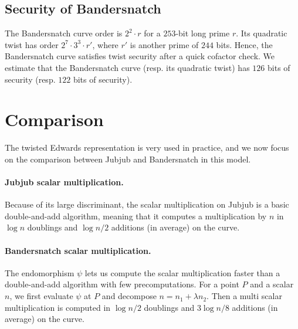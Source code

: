 \documentclass{article}
\newcommand{\SM}[1]{\color{blue}#1\color{black}}
\newcommand{\ZZ}[1]{\color{cyan}#1\color{black}}
\theoremstyle{definition}
\begin{document}
\subsection{Security of Bandersnatch}

The Bandersnatch curve order is $2^2\cdot r$ for a $253$-bit long
prime $r$.
Its quadratic twist has order
$2^7 \cdot 3^3 \cdot r'$, where $r'$ is another prime of $244$ bits.
Hence, the Bandersnatch curve satisfies twist security after a quick cofactor
check.
We estimate that the Bandersnatch curve (resp. its quadratic twist)
has $126$ bits of security (resp. $122$ bits of security).


\section{Comparison}\label{sec:comparison}


The twisted Edwards representation is very used in practice, and we
now focus on the comparison between Jubjub and Bandersnatch in this
model.

\paragraph{Jubjub scalar multiplication.}
Because of its large discriminant, the scalar multiplication on Jubjub
is a basic double-and-add algorithm, meaning that it computes a
multiplication by $n$ in $\log n$ doublings and $\log n/2$
additions (in average) on the curve. 

\paragraph{Bandersnatch scalar multiplication.}
The endomorphism $\psi$ lets us compute the scalar multiplication
faster than a double-and-add algorithm with few precomputations. For a
point $P$ and a scalar $n$, we first evaluate $\psi$ at $P$ and
decompose $n = n_1 + \lambda n_2$. Then a multi scalar multiplication
is computed in $\log n/2$ doublings and $3\log n/8$ additions (in average) on the curve.
\end{document}
